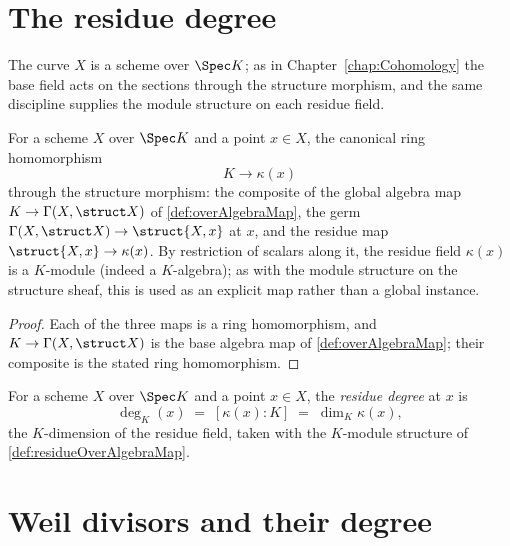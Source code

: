 \section{The residue degree}

The curve \(X\) is a scheme over \(\Spec K\); as in Chapter~\ref{chap:Cohomology} the base field
acts on the sections through the structure morphism, and the same discipline supplies the module
structure on each residue field.

\begin{definition}
  \label{def:residueOverAlgebraMap}
  \leanok
  For a scheme \(X\) over \(\Spec K\) and a point \(x \in X\), the canonical ring homomorphism
  \[
    K \longrightarrow \kappa(x)
  \]
  through the structure morphism: the composite of the global algebra map
  \(K \to \Gamma(X, \struct X)\) of \ref{def:overAlgebraMap}, the germ
  \(\Gamma(X, \struct X) \to \struct{X,x}\) at \(x\), and the residue map
  \(\struct{X,x} \to \kappa(x)\). By restriction of scalars along it, the residue field
  \(\kappa(x)\) is a \(K\)-module (indeed a \(K\)-algebra); as with the module structure on the
  structure sheaf, this is used as an explicit map rather than a global instance.
\end{definition}
\begin{proof}
  \leanok
  Each of the three maps is a ring homomorphism, and \(K \to \Gamma(X, \struct X)\) is the base
  algebra map of \ref{def:overAlgebraMap}; their composite is the stated ring homomorphism.
\end{proof}

\begin{definition}
  \label{def:residueDeg}
  \leanok
  For a scheme \(X\) over \(\Spec K\) and a point \(x \in X\), the \emph{residue degree} at
  \(x\) is
  \[
    \deg_K(x) \;=\; [\kappa(x) : K] \;=\; \dim_K \kappa(x),
  \]
  the \(K\)-dimension of the residue field, taken with the \(K\)-module structure of
  \ref{def:residueOverAlgebraMap}.
\end{definition}

\section{Weil divisors and their degree}

